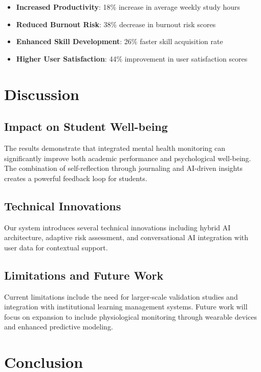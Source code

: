 \documentclass[conference,10pt]{IEEEtran}
\begin{document}
\begin{itemize}
\item \textbf{Increased Productivity}: 18\% increase in average weekly study hours
\item \textbf{Reduced Burnout Risk}: 38\% decrease in burnout risk scores
\item \textbf{Enhanced Skill Development}: 26\% faster skill acquisition rate
\item \textbf{Higher User Satisfaction}: 44\% improvement in user satisfaction scores
\end{itemize}

\section{Discussion}

\subsection{Impact on Student Well-being}

The results demonstrate that integrated mental health monitoring can significantly improve both academic performance and psychological well-being. The combination of self-reflection through journaling and AI-driven insights creates a powerful feedback loop for students.

\subsection{Technical Innovations}

Our system introduces several technical innovations including hybrid AI architecture, adaptive risk assessment, and conversational AI integration with user data for contextual support.

\subsection{Limitations and Future Work}

Current limitations include the need for larger-scale validation studies and integration with institutional learning management systems. Future work will focus on expansion to include physiological monitoring through wearable devices and enhanced predictive modeling.

\section{Conclusion}
\end{document}
